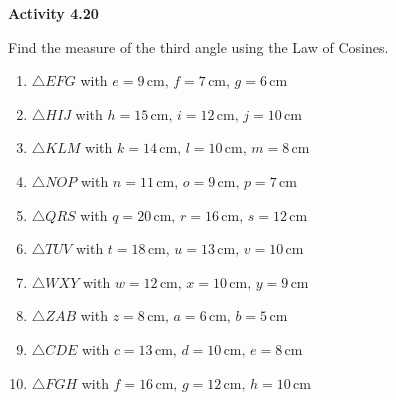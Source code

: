\vspace{0.3ex}
\noindent\textbf{Activity 4.20}

\vspace{0.2ex}

Find the measure of the third angle using the Law of Cosines.

\begin{enumerate}
    \item \(\triangle EFG\) with \(e = 9 \, \text{cm}, \, f = 7 \, \text{cm}, \, g = 6 \, \text{cm}\)
    \item \(\triangle HIJ\) with \(h = 15 \, \text{cm}, \, i = 12 \, \text{cm}, \, j = 10 \, \text{cm}\)
    \item \(\triangle KLM\) with \(k = 14 \, \text{cm}, \, l = 10 \, \text{cm}, \, m = 8 \, \text{cm}\)
    \item \(\triangle NOP\) with \(n = 11 \, \text{cm}, \, o = 9 \, \text{cm}, \, p = 7 \, \text{cm}\)
    \item \(\triangle QRS\) with \(q = 20 \, \text{cm}, \, r = 16 \, \text{cm}, \, s = 12 \, \text{cm}\)
    \item \(\triangle TUV\) with \(t = 18 \, \text{cm}, \, u = 13 \, \text{cm}, \, v = 10 \, \text{cm}\)
    \item \(\triangle WXY\) with \(w = 12 \, \text{cm}, \, x = 10 \, \text{cm}, \, y = 9 \, \text{cm}\)
    \item \(\triangle ZAB\) with \(z = 8 \, \text{cm}, \, a = 6 \, \text{cm}, \, b = 5 \, \text{cm}\)
    \item \(\triangle CDE\) with \(c = 13 \, \text{cm}, \, d = 10 \, \text{cm}, \, e = 8 \, \text{cm}\)
    \item \(\triangle FGH\) with \(f = 16 \, \text{cm}, \, g = 12 \, \text{cm}, \, h = 10 \, \text{cm}\)
\end{enumerate}
